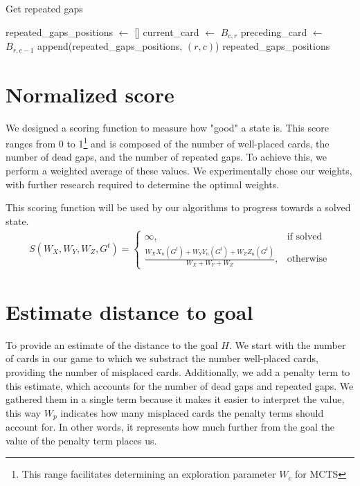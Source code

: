 \begin{algorithm}[H]
    \caption{Get repeated gaps}
    \begin{algorithmic}
        \State repeated\_gaps\_positions $\gets$ []
                \State current\_card $\gets$ $B_{c,r}$
                \State preceding\_card $\gets$ $B_{r,c-1}$
                    \State append(repeated\_gaps\_positions, $(r,c)$)
                \EndIf
            \EndFor
        \EndFor
        \Return repeated\_gaps\_positions
    \end{algorithmic}
\end{algorithm}

\section{Normalized score} \label{score}
We designed a scoring function to measure how "good" a state is. This score ranges from 0 to 1\footnote{This range facilitates determining an exploration parameter $W_c$ for MCTS} and is composed of the number of well-placed cards, the number of dead gaps, and the number of repeated gaps. To achieve this, we perform a weighted average of these values. We experimentally chose our weights, with further research required to determine the optimal weights.

This scoring function will be used by our algorithms to progress towards a solved state.
\begin{align}
    S\left(W_X, W_Y, W_Z, G^t\right) = \begin{cases}
       \infty, & \text{if solved} \\
        \frac{W_XX_n\left(G^t\right) + W_YY_n\left(G^t\right) + W_ZZ_n\left(G^t\right)}{W_X + W_Y + W_Z}, & \text{otherwise}
    \end{cases}
\end{align}

\section{Estimate distance to goal} \label{heuristic}
To provide an estimate of the distance to the goal $H$. We start with the number of cards in our game to which we substract the number well-placed cards, providing the number of misplaced cards. Additionally, we add a penalty term to this estimate, which accounts for the number of dead gaps and repeated gaps. We gathered them in a single term because it makes it easier to interpret the value, this way $W_p$ indicates how many misplaced cards the penalty terms should account for. In other words, it represents how much further from the goal the value of the penalty term places us.

